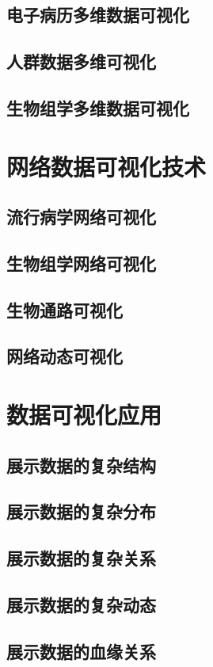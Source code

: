 \documentclass[lang=cn,color=black,10pt,founder,newtx]{elegantbook}
\begin{document}
\subsection{电子病历多维数据可视化}
\subsection{人群数据多维可视化}
\subsection{生物组学多维数据可视化}


\section{网络数据可视化技术}
\subsection{流行病学网络可视化}
\subsection{生物组学网络可视化}
\subsection{生物通路可视化}
\subsection{网络动态可视化}

\section{数据可视化应用}
\subsection{展示数据的复杂结构}
\subsection{展示数据的复杂分布}
\subsection{展示数据的复杂关系}
\subsection{展示数据的复杂动态}
\subsection{展示数据的血缘关系}
\end{document}
